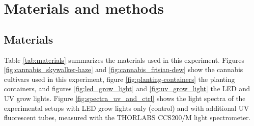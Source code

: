 \section{Materials and methods}

\subsection{Materials}

Table \ref{tab:materials} summarizes the materials used in this experiment. Figures \ref{fig:cannabis_skywalker-haze} and \ref{fig:cannabis_frisian-dew} show the cannabis cultivars used in this experiment, figure \ref{fig:planting-containers} the planting containers, and figures \ref{fig:led_grow_light} and \ref{fig:uv_grow_light} the LED and UV grow lights. Figure \ref{fig:spectra_uv_and_ctrl} shows the light spectra of the experimental setups with LED grow lights only (control) and with additional UV fluorescent tubes, measured with the THORLABS CCS200/M light spectrometer.

